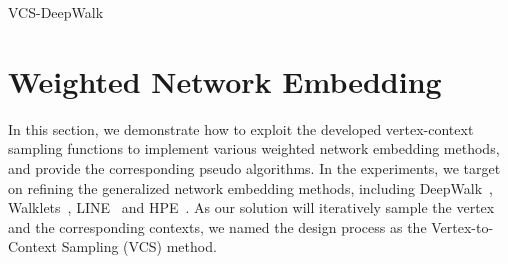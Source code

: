 \begin{algorithm}[htb]
\caption{VCS-DeepWalk}
\label{alg:dw}
\DontPrintSemicolon
{}



\end{algorithm}

\section{Weighted Network Embedding}
\label{sec:wne}

In this section, we demonstrate how to exploit the developed vertex-context sampling functions to implement various weighted network embedding methods, and provide the corresponding pseudo algorithms.  In the experiments, we target on refining the generalized network embedding methods, including DeepWalk~\cite{dw}, Walklets~\cite{wl}, LINE~\cite{line} and HPE~\cite{hpe}.
As our solution will iteratively sample the vertex and the corresponding contexts, we named the design process as the Vertex-to-Context Sampling (VCS) method.


